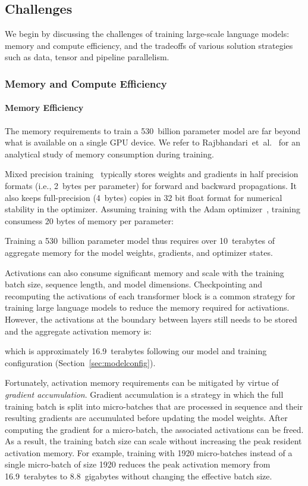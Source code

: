 \documentclass[11pt]{article}
\begin{document}
\subsection{Challenges}

We begin by discussing the challenges of training large-scale language models: memory and compute efficiency, and the tradeoffs of various solution strategies such as data, tensor and pipeline parallelism.

\subsubsection{Memory and Compute Efficiency}
    
\paragraph{Memory Efficiency} The memory requirements to train a 530~billion parameter
model are far beyond what is available on a single GPU device. 
We refer to Rajbhandari~et~al.~\cite{rajbhandari2021zero} for an analytical
study of memory consumption during training.

Mixed precision training~\cite{micikevicius2017mixed} typically stores weights and gradients in half precision formats (i.e., 2~bytes per parameter) 
for forward and backward propagations. It also keeps full-precision (4~bytes) copies in 32 bit float format for numerical stability
in the optimizer. Assuming training with the Adam optimizer~\cite{kingma2014adam},
training consumess 20 bytes of memory per parameter:

Training a 530~billion parameter model thus requires over 10~terabytes of aggregate memory for the model weights, gradients, and optimizer states.

Activations can also consume significant memory and scale with the training batch size, sequence length,
and model dimensions. Checkpointing and recomputing the activations of
each transformer block is a common strategy for training large language models to reduce the memory required for activations.
However, the activations at the boundary between layers still needs to be stored and the aggregate activation memory is:

which is approximately 16.9~terabytes following our model and training configuration (Section~\ref{sec:modelconfig}).

Fortunately, activation memory requirements can be mitigated by virtue of
\emph{gradient accumulation}. Gradient accumulation is a strategy in which the full training
batch is split into micro-batches that are processed in sequence and their resulting gradients are
accumulated before updating the model weights. After computing the gradient for a micro-batch, the
associated activations can be freed. As a result, the training batch size can scale without
increasing the peak resident activation memory. For example, training with 1920 micro-batches
instead of a single micro-batch of size 1920 reduces the peak activation memory from 16.9~terabytes
to 8.8~gigabytes without changing the effective batch size. 
\end{document}
